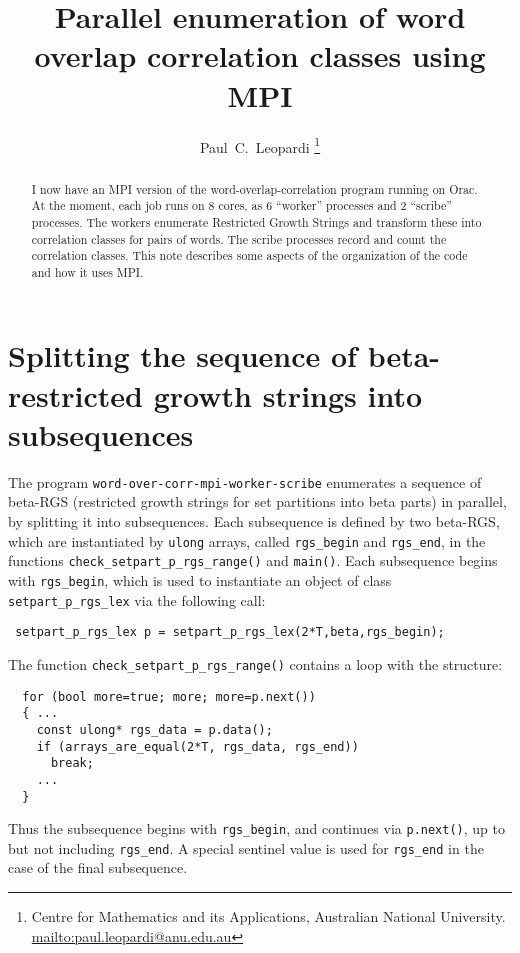 \documentclass[12pt,a4paper]{article}
\title{Parallel enumeration of word overlap correlation classes using MPI}
\author{
Paul~C.~Leopardi
\thanks{Centre for Mathematics and its Applications, Australian National University.
\protect\url{mailto:paul.leopardi@anu.edu.au}}
}
\date{}
\begin{document}
\maketitle

\begin{abstract}
I now have an MPI version of the word-overlap-correlation program running on Orac. 
At the moment, each job runs on 8 cores, as 6 ``worker'' processes and 2 ``scribe'' processes. 
The workers enumerate Restricted Growth Strings and transform these into 
correlation classes for pairs of words. 
The scribe processes record and count the correlation classes.
This note describes some aspects of the organization of the code and how it uses MPI.
\end{abstract}

\section*{Splitting the sequence of beta-restricted growth strings into sub\-sequences}

The program \texttt{word-over-corr-mpi-worker-scribe} enumerates a sequence of 
beta-RGS (restricted growth strings for set partitions into beta parts) 
in parallel, by splitting it into subsequences. Each subsequence is defined
by two beta-RGS, which are instantiated by \texttt{ulong} arrays, called \verb!rgs_begin! 
and \verb!rgs_end!, in the functions \verb!check_setpart_p_rgs_range()! and \verb!main()!. 
Each subsequence begins with \verb!rgs_begin!, which is used to instantiate an 
object of class \verb!setpart_p_rgs_lex! via the following call:
\begin{verbatim}
 setpart_p_rgs_lex p = setpart_p_rgs_lex(2*T,beta,rgs_begin);
\end{verbatim}

The function \verb!check_setpart_p_rgs_range()! contains a loop with the structure:

\begin{verbatim}
  for (bool more=true; more; more=p.next())
  { ...
    const ulong* rgs_data = p.data();
    if (arrays_are_equal(2*T, rgs_data, rgs_end))
      break;
    ...
  }
\end{verbatim}

Thus the subsequence begins with \verb!rgs_begin!, and continues via \verb!p.next()!, 
up to but not including \verb!rgs_end!. A special sentinel value is used for 
\verb!rgs_end! in the case of the final subsequence.
\end{document}
